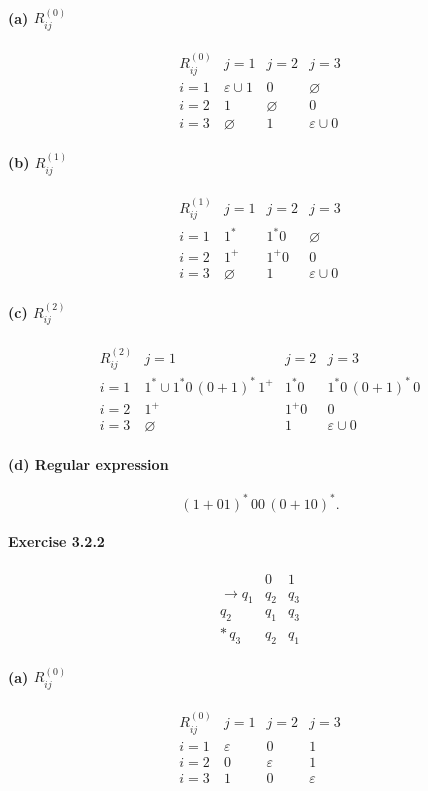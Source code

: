 \documentclass{article}
\theoremstyle{theorem}
\theoremstyle{definition}
\theoremstyle{remark}
\begin{document}
\paragraph{(a) \(R_{ij}^{(0)}\)}
\[
\begin{array}{c|ccc}
R_{ij}^{(0)} & j=1 & j=2 & j=3\\\hline
i=1 & \varepsilon\cup1 & 0 & \varnothing\\
i=2 & 1 & \varnothing & 0\\
i=3 & \varnothing & 1 & \varepsilon\cup0
\end{array}
\]
\paragraph{(b) \(R_{ij}^{(1)}\)}
\[
\begin{array}{c|ccc}
R_{ij}^{(1)} & j=1 & j=2 & j=3\\\hline
i=1 & 1^* & 1^*0 & \varnothing\\
i=2 & 1^+ & 1^+0 & 0\\
i=3 & \varnothing & 1 & \varepsilon\cup0
\end{array}
\]
\paragraph{(c) \(R_{ij}^{(2)}\)}
\[
\begin{array}{c|ccc}
R_{ij}^{(2)} & j=1 & j=2 & j=3\\\hline
i=1 & 1^*\cup1^*0\,(0+1)^*\,1^+ 
      & 1^*0 
      & 1^*0\,(0+1)^*\,0\\
i=2 & 1^+ & 1^+0 & 0\\
i=3 & \varnothing & 1 & \varepsilon\cup0
\end{array}
\]
\paragraph{(d) Regular expression}
\[
(1 + 01)^*\,00\,(0 + 10)^*.
\]

\paragraph*{Exercise 3.2.2}
\[
\begin{array}{c|cc}
     &0&1\\\hline
\to q_1 & q_2 & q_3\\
      q_2 & q_1 & q_3\\
*\,q_3 & q_2 & q_1
\end{array}
\]
\paragraph{(a) \(R_{ij}^{(0)}\)}
\[
\begin{array}{c|ccc}
R_{ij}^{(0)} & j=1 & j=2 & j=3\\\hline
i=1 & \varepsilon & 0 & 1\\
i=2 & 0 & \varepsilon & 1\\
i=3 & 1 & 0 & \varepsilon
\end{array}
\]
\end{document}
